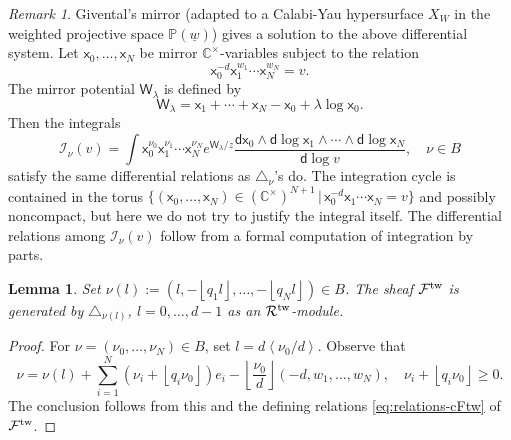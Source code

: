 \documentclass[11pt]{amsart}
\newtheorem{lem}[thm]{Lemma} %
\theoremstyle{definition} %
\theoremstyle{remark} %
\newtheorem{rem}[thm]{Remark}%
\newcommand{\CC}{\mathbb C}
\newcommand{\PP}{\mathbb P}
\newcommand{\tw}{{\rm tw}}
\def\fracp#1{\left\langle #1 \right\rangle}
\def\floor#1{\left\lfloor #1 \right\rfloor}
\newcommand{\cO}{\mathcal{O}}
\newcommand{\cMo}{\mathcal{M}^\circ}
\newcommand{\cI}{\mathcal{I}}
\newcommand{\cF}{\mathcal{F}}
\newcommand{\cR}{\mathcal{R}}
\newcommand{\dd}{\mathsf{d}}
\newcommand{\vc}{v_{\rm c}}
\newcommand{\sfx}{\mathsf{x}}
\newcommand{\mW}{\mathsf{W}}
\newcommand{\uw}{\underline{w}}
\begin{document}
\begin{rem} 
\label{rem:equiv-mirror-int} 
Givental's mirror \cite{Givental:mirrorthm-toric} 
(adapted to a Calabi-Yau hypersurface $X_W$ 
in the weighted projective space $\PP(\uw)$) 
gives a solution to the above differential system. 
Let $\sfx_0,\dots,\sfx_N$ be mirror $\CC^\times$-variables 
subject to the relation 
\[
\sfx_0^{-d} \sfx_1^{w_1} \cdots \sfx_N^{w_N} = v. 
\]
The mirror potential $\mW_\lambda$ is defined by 
\[
\mW_\lambda = \sfx_1 + \cdots + \sfx_N - \sfx_0 + 
\lambda\log \sfx_0. 
\]
Then the integrals 
\[
\cI_\nu(v) = \int \sfx_0^{\nu_0} \sfx_1^{\nu_1} 
\cdots \sfx_N^{\nu_N} 
e^{\mW_\lambda/z} \frac{\dd \sfx_0 \wedge 
\dd \log \sfx_1 \wedge 
\cdots \wedge \dd\log \sfx_N}{\dd \log v}, 
\quad 
\nu\in B 
\]
satisfy the same differential relations 
as $\triangle_\nu$'s do. 
The integration cycle is contained in the torus 
$\{(\sfx_0,\dots,\sfx_N)\in (\CC^\times)^{N+1} 
\,|\, \sfx_0^{-d} \sfx_1\cdots\sfx_N = v\}$ and 
possibly noncompact, 
but here we do not try to justify the integral itself.   
The differential relations among $\cI_\nu(v)$ 
follow from a formal computation of integration by parts. 
\end{rem} 

\begin{lem} 
\label{lem:generation-over-Rtw} 
Set $\nu(l) := (l,-\floor{q_1 l},\dots,-\floor{q_N l}) 
\in B$. 
The sheaf $\cF^\tw$ is generated by 
$\triangle_{\nu(l)}$, $l=0,\dots,d-1$ as an $\cR^\tw$-module.  
\end{lem} 
\begin{proof} 
For $\nu =(\nu_0,\dots,\nu_N)\in B$, set $l = d \fracp{\nu_0/d}$. 
Observe that 
\[
\nu = \nu(l) + 
\sum_{i=1}^N (\nu_i + \floor{q_i \nu_0}) e_i 
-\floor{\frac{\nu_0}{d}} (-d, w_1,\dots,w_N), 
\quad 
\nu_i + \floor{q_i \nu_0} \ge 0.  
\]
The conclusion follows from this and the defining relations 
\eqref{eq:relations-cFtw} of $\cF^\tw$. 
\end{proof} 
% 
\end{document}

